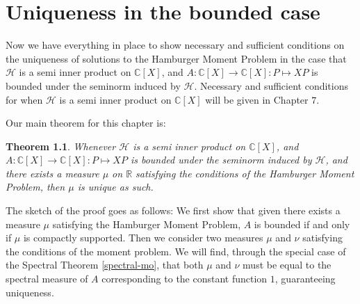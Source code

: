 \documentclass[12pt,oneside]{report}
\newtheorem{thm}{Theorem}[chapter]
\begin{document}

\chapter{Uniqueness in the bounded case}

Now we have everything in place to show necessary and sufficient conditions on the uniqueness of solutions to the Hamburger Moment Problem in the case that $\mathcal{H}$ is a semi inner product on $\mathbb{C}[X]$, and $A: \mathbb{C}[X] \to \mathbb{C}[X]: P \mapsto XP$ is bounded under the seminorm induced by $\mathcal{H}$. Necessary and sufficient conditions for when $\mathcal{H}$ is a semi inner product on $\mathbb{C}[X]$ will be given in Chapter $7$.
 
Our main theorem for this chapter is:

\begin{thm}\label{uniqueness}
    Whenever $\mathcal{H}$ is a semi inner product on $\mathbb{C}[X]$, and $A: \mathbb{C}[X] \to \mathbb{C}[X]: P \mapsto XP$ is bounded under the seminorm induced by $\mathcal{H}$, and there exists a measure $\mu$ on $\mathbb{R}$ satisfying the conditions of the Hamburger Moment Problem, then $\mu$ is unique as such.
\end{thm}

The sketch of the proof goes as follows: We first show that given there exists a measure $\mu$ satisfying the Hamburger Moment Problem, $A$ is bounded if and only if $\mu$ is compactly supported. Then we consider two measures $\mu$ and $\nu$ satisfying the conditions of the moment problem. We will find, through the special case of the Spectral Theorem \ref{spectral-mo}, that both $\mu$ and $\nu$ must be equal to the spectral measure of $A$ corresponding to the constant function $1$, guaranteeing uniqueness.

\end{document}
